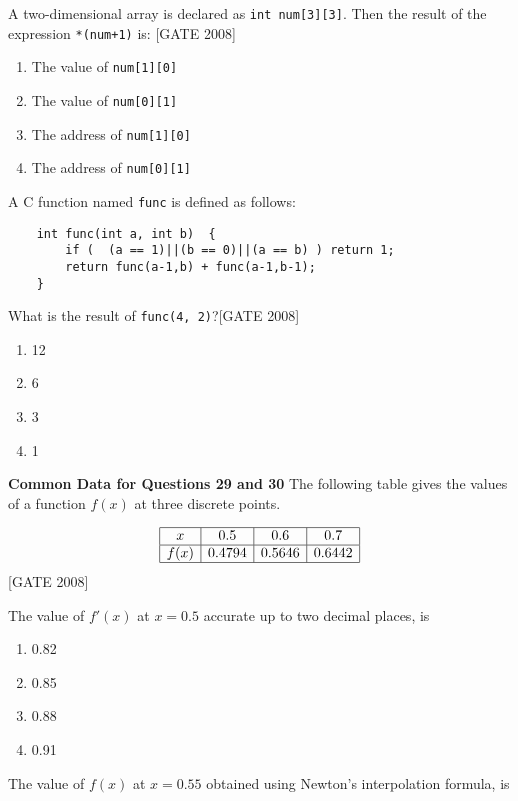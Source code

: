 \item A two-dimensional array is declared as \texttt{int num[3][3]}. Then the result of the expression \texttt{*(num+1)} is:
\hfill{[GATE 2008]}

\begin{enumerate}
    \item The value of \texttt{num[1][0]}
    \item The value of \texttt{num[0][1]}
    \item The address of \texttt{num[1][0]}
    \item The address of \texttt{num[0][1]}
\end{enumerate}

\item A C function named \texttt{func} is defined as follows:
\begin{verbatim}
    int func(int a, int b)  {
        if (  (a == 1)||(b == 0)||(a == b) ) return 1;
        return func(a-1,b) + func(a-1,b-1);
    }
\end{verbatim}


What is the result of \texttt{func(4, 2)}?\hfill{[GATE 2008]}

\begin{multicols}{4}
\begin{enumerate}
    \item 12
    \item 6
    \item 3
    \item 1
\end{enumerate}
\end{multicols}
 \textbf{Common Data for Questions 29 and 30}
The following table gives the values of a function $f(x)$ at three discrete points.

\[
\begin{array}{|c|c|c|c|}
\hline
x & 0.5 & 0.6 & 0.7 \\
\hline
f(x) & 0.4794 & 0.5646 & 0.6442 \\
\hline
\end{array}
\]
\hfill{[GATE 2008]}
\item The value of $f'(x)$ at $x = 0.5$ accurate up to two decimal places, is

\begin{multicols}{4}
\begin{enumerate}
    \item 0.82
    \item 0.85
    \item 0.88
    \item 0.91
\end{enumerate}
\end{multicols}
\item The value of $f(x)$ at $x = 0.55$ obtained using Newton's interpolation formula, is


